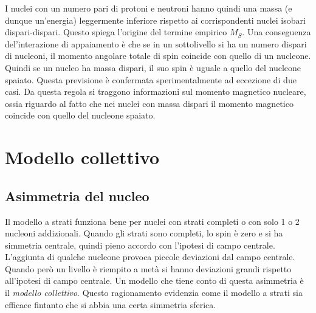 I nuclei con un numero pari di protoni e neutroni hanno quindi una massa (e
dunque un'energia) leggermente inferiore rispetto ai corrispondenti nuclei
isobari dispari-dispari. Questo spiega l'origine del termine empirico $M_S$.
Una conseguenza del'interazione di appaiamento è che se in un sottolivello si 
ha
un numero dispari di nucleoni, il momento angolare totale di spin coincide con
quello di un nucleone. Quindi se un nucleo ha massa dispari, il suo spin è
uguale a quello del nucleone spaiato. Questa previsione è confermata
sperimentalmente ad eccezione di due casi. Da questa regola si traggono
informazioni sul momento magnetico nucleare, ossia riguardo al fatto che nei
nuclei con massa dispari il momento magnetico coincide con quello del nucleone
spaiato.

\section{Modello collettivo}
\subsection{Asimmetria del nucleo}
Il modello a strati funziona bene per nuclei con strati completi o con solo 1 o 
2 nucleoni addizionali. Quando gli strati sono completi, lo spin è zero e si 
ha simmetria centrale, quindi pieno accordo con l'ipotesi di campo centrale. 
L'aggiunta di qualche nucleone provoca piccole deviazioni dal campo centrale. 
Quando però un livello è riempito a metà si hanno deviazioni grandi rispetto 
all'ipotesi di campo centrale. Un modello che tiene conto di questa asimmetria 
è il \textit{modello collettivo}.
Questo ragionamento evidenzia come il modello a strati sia efficace fintanto 
che si abbia una certa simmetria sferica.
